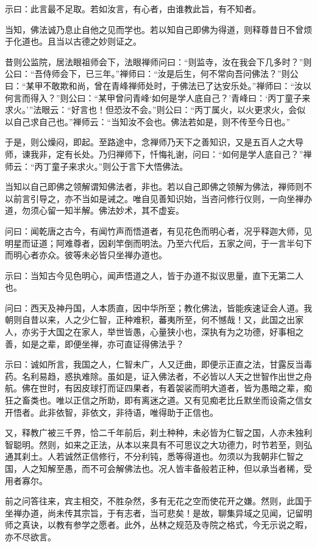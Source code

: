 示曰：此言最不足取。若如汝言，有心者，由谁教此旨，有不知者。

当知，佛法诚乃息止自他之见而学也。若以知自己即佛为得道，则释尊昔日不曾烦于化道也。且当以古德之妙则证之。

昔则公监院，居法眼祖师会下，法眼禅师问曰：“则监寺，汝在我会下几多时？”则公曰：“吾侍师会下，已三年。”禅师曰：“汝是后生，何不常向吾问佛法？”则公曰：“某甲不敢欺和尚，曾在青峰禅师处时，于佛法已了达安乐处。”禅师曰：“汝以何言而得入？”则公曰：“某甲曾问青峰‘如何是学人底自己？’青峰曰：‘丙丁童子来求火。’”法眼云：“好言也！但恐汝不会。”则公曰：“丙丁属火，以火更求火，会似以自己求自己也。”禅师云：“当知汝不会也。佛法若如是，则不传至今日也。”

于是，则公燥闷，即起。至路途中，念禅师乃天下之善知识，又是五百人之大导师，谏我非，定有长处。乃归禅师下，忏悔礼谢，问曰：“如何是学人底自己？”禅师云：“丙丁童子来求火。”则公于言下大悟佛法。

当知以自己即佛之领解谓知佛法者，非也。若以自己即佛之领解为佛法，禅师则不以前言引导之，亦不当如是诫之。唯自见善知识始，当咨问修行仪则，一向坐禅办道，勿须心留一知半解。佛法妙术，其不虚妄。

问曰：闻乾唐之古今，有闻竹声而悟道者，有见花色而明心者，况乎释迦大师，见明星而证道；阿难尊者，因刹竿倒而明法。乃至六代后，五家之间，于一言半句下而明心者亦众。彼等未必皆只坐禅办道也。

示曰：当知古今见色明心，闻声悟道之人，皆于办道不拟议思量，直下无第二人也。

问曰：西天及神丹国，人本质直，因中华所至；教化佛法，皆能疾速证会人道。我朝则自昔以来，人之少仁智，正种难积，蕃夷所至，何不憾哉！又，此国之出家人，亦劣于大国之在家人，举世皆愚，心量狭小也，深执有为之功德，好事相之善，如是之辈，即便坐禅，亦可直证得佛法乎？

示曰：诚如所言，我国之人，仁智未广，人又迂曲，即便示正直之法，甘露反当毒药。名利易趋，惑执难除。虽如是，证入佛法者，不必皆以人天之世智作出世之舟航。佛在世时，有因皮球打而证四果者，有着袈裟而明大道者，皆为愚暗之辈，痴狂之畜类也。唯以正信之所助，即有离迷之道。又有见痴老比丘默坐而设斋之信女开悟者。此非依智，非依文，非待语，唯得助于正信也。

又，释教广被三千界，恰二千年前后，刹土种种，未必皆为仁智之国，人亦未独利智聪明。然则，如来之正法，从本以来具有不可思议之大功德力，时节若至，则弘通其刹土。人若诚然正信修行，不分利钝，悉等得道也。勿须以为我朝非仁智之国，人之知解至愚，而不可会解佛法也。况人皆丰备般若正种，但以承当者稀，受用者寡尔。

前之问答往来，宾主相交，不胜杂然，多有无花之空而使花开之嫌。然则，此国于坐禅办道，尚未传其宗旨，于有志者，当可悲矣！是故，聊集异域之见闻，记留明师之真诀，以教有参学之愿者。此外，丛林之规范及寺院之格式，今无示说之暇，亦不尽欲言。

